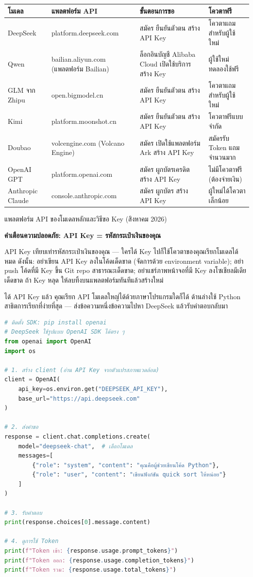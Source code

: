 \begin{center}
\begin{tabularx}{\linewidth}{|X|X|X|X|}
\hline
\textbf{โมเดล} & \textbf{แพลตฟอร์ม API} & \textbf{ขั้นตอนการขอ} & \textbf{โควตาฟรี} \tabularnewline
\hline
DeepSeek & platform.deepseek.com & สมัคร ยืนยันตัวตน สร้าง API Key & โควตาแถมสำหรับผู้ใช้ใหม่ \tabularnewline
Qwen & bailian.aliyun.com (แพลตฟอร์ม Bailian) & ล็อกอินบัญชี Alibaba Cloud เปิดใช้บริการ สร้าง Key & ผู้ใช้ใหม่ทดลองใช้ฟรี \tabularnewline
GLM จาก Zhipu & open.bigmodel.cn & สมัคร ยืนยันตัวตน สร้าง API Key & โควตาแถมสำหรับผู้ใช้ใหม่ \tabularnewline
Kimi & platform.moonshot.cn & สมัคร ยืนยันตัวตน สร้าง API Key & โควตาฟรีแบบจำกัด \tabularnewline
Doubao & volcengine.com (Volcano Engine) & สมัคร เปิดใช้แพลตฟอร์ม Ark สร้าง API Key & สมัครรับ Token แถมจำนวนมาก \tabularnewline
OpenAI GPT & platform.openai.com & สมัคร ผูกบัตรเครดิต สร้าง API Key & ไม่มีโควตาฟรี (ต้องจ่ายเงิน) \tabularnewline
Anthropic Claude & console.anthropic.com & สมัคร ผูกบัตร สร้าง API Key & ผู้ใหม่ได้โควตาเล็กน้อย \tabularnewline
\hline
\end{tabularx}
\end{center}

\begin{center}\small\color{gray}แพลตฟอร์ม API ของโมเดลหลักและวิธีขอ Key (สิงหาคม 2026)\end{center}

\textbf{คำเตือนความปลอดภัย: API Key = รหัสกระเป๋าเงินของคุณ}\par

API Key เทียบเท่ารหัสกระเป๋าเงินของคุณ — ใครได้ Key ไปก็ใช้โควตาของคุณเรียกโมเดลได้หมด ดังนั้น: อย่าเขียน API Key ลงในโค้ดเด็ดขาด (จัดการด้วย environment variable); อย่า push โค้ดที่มี Key ขึ้น Git repo สาธารณะเด็ดขาด; อย่าแชร์ภาพหน้าจอที่มี Key ลงโซเชียลมีเดียเด็ดขาด ถ้า Key หลุด ให้ลบทิ้งบนแพลตฟอร์มทันทีแล้วสร้างใหม่


ได้ API Key แล้ว คุณเรียก API โมเดลใหญ่ได้ด้วยภาษาโปรแกรมใดก็ได้ ด้านล่างใช้ Python สาธิตการเรียกที่ง่ายที่สุด — ส่งข้อความหนึ่งข้อความไปหา DeepSeek แล้วรับคำตอบกลับมา

\begin{lstlisting}[language=Python]
# ติดตั้ง SDK: pip install openai
# DeepSeek ใช้รูปแบบ OpenAI SDK ได้ตรง ๆ
from openai import OpenAI
import os

# 1. สร้าง client (อ่าน API Key จากตัวแปรสภาพแวดล้อม)
client = OpenAI(
    api_key=os.environ.get("DEEPSEEK_API_KEY"),
    base_url="https://api.deepseek.com"
)

# 2. ส่งคำขอ
response = client.chat.completions.create(
    model="deepseek-chat",  # เลือกโมเดล
    messages=[
        {"role": "system", "content": "คุณคือผู้ช่วยเขียนโค้ด Python"},
        {"role": "user", "content": "เขียนฟังก์ชัน quick sort ให้หน่อย"}
    ]
)

# 3. รับคำตอบ
print(response.choices[0].message.content)

# 4. ดูการใช้ Token
print(f"Token เข้า: {response.usage.prompt_tokens}")
print(f"Token ออก: {response.usage.completion_tokens}")
print(f"Token รวม: {response.usage.total_tokens}")
\end{lstlisting}

